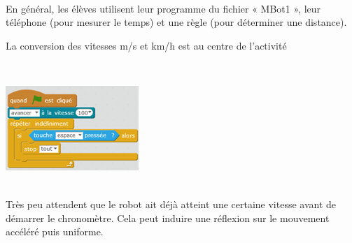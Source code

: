 \begin{minipage}[t]{0.5\linewidth}
    \begin{methode}~\\
        En général, les élèves utilisent leur programme du fichier « MBot1 », leur téléphone (pour mesurer le temps)
        et une règle (pour déterminer une distance). 
        
        La conversion des vitesses m/s et km/h est au centre de l’activité
        
        ~\\
        \begin{center}
            \includegraphics[width=0.85\linewidth]{res/mbot-vitesse-sol.png}
        \end{center}
    \end{methode}
\end{minipage}
\hfill
\begin{minipage}[t]{0.5\linewidth}
    \begin{remarque}~\\
        Très peu attendent que le robot ait déjà atteint une certaine vitesse avant de
        démarrer le chronomètre. Cela peut induire une réflexion sur le mouvement
        accéléré puis uniforme.
        
    \end{remarque}

\end{minipage}